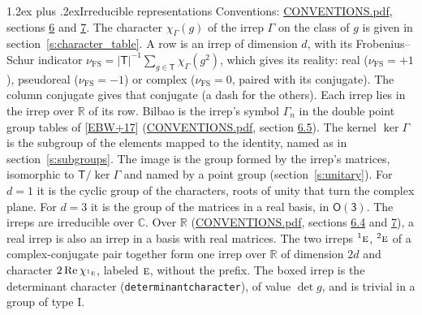 \documentclass[10pt,a4paper]{article}
\makeatletter
\renewcommand\section{\@startsection{section}{1}{\z@}{-3ex plus -1ex minus -.2ex}%
  {1.2ex plus .2ex}{\normalfont\large\sffamily\bfseries\color{parttitle}}}
\numberwithin{equation}{section}
\newcommand{\grp}[1]{\mathsf{#1}}
\newcommand{\irr}[1]{\text{\normalfont\scshape #1}}
\newcommand{\conjpair}[1]{{}^{#1}}
\newcommand{\irchar}[1]{\chi_{#1}}
\newcommand{\fsind}{\nu_{\mathrm{FS}}}
\makeatother
\begin{document}
\section{Irreducible representations}\label{s:irreps}
Conventions: \href{../../CONVENTIONS.pdf}{CONVENTIONS.pdf}, sections \href{../../CONVENTIONS.pdf\#conv.6}{6} and \href{../../CONVENTIONS.pdf\#conv.7}{7}.
\leavevmode\label{n:function.character}\label{n:irrep.Gamma}The character $\irchar{\Gamma}(g)$ of the irrep $\Gamma$ on the class of $g$ is given in section~\ref{s:character_table}.
\leavevmode\label{n:index.dimension}\label{n:index.frobenius}\label{n:head.irrep}\label{n:head.reality}A row is an irrep of dimension $d$, with its Frobenius--Schur indicator $\fsind = |\grp{T}|^{-1}\allowbreak\sum_{g\in\grp{T}}\irchar{\Gamma}(g^2)$, which gives its reality: real ($\fsind = +1$), pseudoreal ($\fsind = -1$) or complex ($\fsind = 0$, paired with its conjugate). \label{n:head.conjugate}The column conjugate gives that conjugate (a dash for the others). \label{n:head.over.real}Each irrep lies in the irrep over $\mathbb{R}$ of its row. \label{n:head.bilbao}\label{n:irrep.alias.gamma}Bilbao is the irrep's symbol $\Gamma_n$ in the double point group tables of [\href{../../../REFERENCES.pdf\#ref.EBW+17}{EBW+17}] (\href{../../CONVENTIONS.pdf}{CONVENTIONS.pdf}, section \href{../../CONVENTIONS.pdf\#conv.6.5}{6.5}). \label{n:head.kernel}The kernel $\ker\Gamma$ is the subgroup of the elements mapped to the identity, named as in section~\ref{s:subgroups}. \label{n:head.image}The image is the group formed by the irrep's matrices, isomorphic to $\grp{T}/\ker\Gamma$ and named by a point group (section~\ref{s:unitary}). For $d = 1$ it is the cyclic group of the characters, roots of unity that turn the complex plane. For $d = 3$ it is the group of the matrices in a real basis, in \href{O3.pdf}{$\grp{O(3)}$}. The irreps are irreducible over $\mathbb{C}$. Over $\mathbb{R}$ (\href{../../CONVENTIONS.pdf}{CONVENTIONS.pdf}, sections \href{../../CONVENTIONS.pdf\#conv.6.4}{6.4} and \href{../../CONVENTIONS.pdf\#conv.7}{7}), a real irrep is also an irrep in a basis with real matrices. The two irreps $\conjpair{1}\irr{e}$, $\conjpair{2}\irr{e}$ of a complex-conjugate pair together form one irrep over $\mathbb{R}$ of dimension $2d$ and character $2\operatorname{Re}\irchar{\conjpair{1}\irr{e}}$, labeled $\irr{e}$, without the prefix. \label{n:mark.determinant}The boxed irrep is the determinant character (\texttt{determinantcharacter}), of value $\det g$, and is trivial in a group of type I.
\setlength{\emergencystretch}{2em}\par\setlength{\emergencystretch}{0pt}
\end{document}

